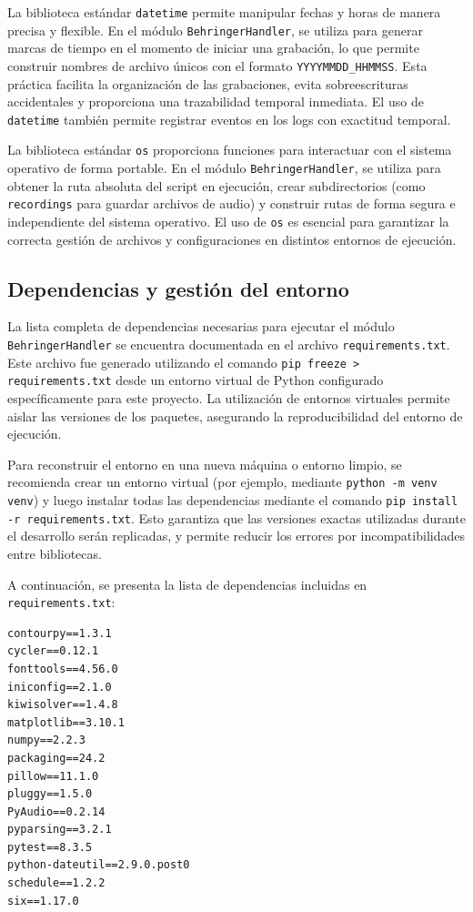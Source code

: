 La biblioteca estándar \texttt{datetime} permite manipular fechas y horas de manera precisa y flexible. En el módulo  \texttt{BehringerHandler}, se utiliza para generar marcas de tiempo en el momento de iniciar una grabación, lo que permite construir nombres de archivo únicos con el formato \texttt{YYYYMMDD\_HHMMSS}. Esta práctica facilita la organización de las grabaciones, evita sobreescrituras accidentales y proporciona una trazabilidad temporal inmediata. El uso de \texttt{datetime} también permite registrar eventos en los logs con exactitud temporal.

La biblioteca estándar \texttt{os} proporciona funciones para interactuar con el sistema operativo de forma portable. En el módulo \texttt{BehringerHandler}, se utiliza para obtener la ruta absoluta del script en ejecución, crear subdirectorios (como \texttt{recordings} para guardar archivos de audio) y construir rutas de forma segura e independiente del sistema operativo.  El uso de \texttt{os} es esencial para garantizar la correcta gestión de archivos y configuraciones en distintos entornos de ejecución.


\subsection{Dependencias y gestión del entorno}

La lista completa de dependencias necesarias para ejecutar el módulo \texttt{BehringerHandler} se encuentra documentada en el archivo \texttt{requirements.txt}. Este archivo fue generado utilizando el comando \texttt{pip freeze > requirements.txt} desde un entorno virtual de Python configurado específicamente para este proyecto. La utilización de entornos virtuales permite aislar las versiones de los paquetes, asegurando la reproducibilidad del entorno de ejecución.

Para reconstruir el entorno en una nueva máquina o entorno limpio, se recomienda crear un entorno virtual (por ejemplo, mediante \texttt{python -m venv venv}) y luego instalar todas las dependencias mediante el comando \texttt{pip install -r requirements.txt}. Esto garantiza que las versiones exactas utilizadas durante el desarrollo serán replicadas, y permite reducir los  errores por incompatibilidades entre bibliotecas.

A continuación, se presenta la lista de dependencias incluidas en \texttt{requirements.txt}:

\begin{verbatim}
contourpy==1.3.1
cycler==0.12.1
fonttools==4.56.0
iniconfig==2.1.0
kiwisolver==1.4.8
matplotlib==3.10.1
numpy==2.2.3
packaging==24.2
pillow==11.1.0
pluggy==1.5.0
PyAudio==0.2.14
pyparsing==3.2.1
pytest==8.3.5
python-dateutil==2.9.0.post0
schedule==1.2.2
six==1.17.0
\end{verbatim}


